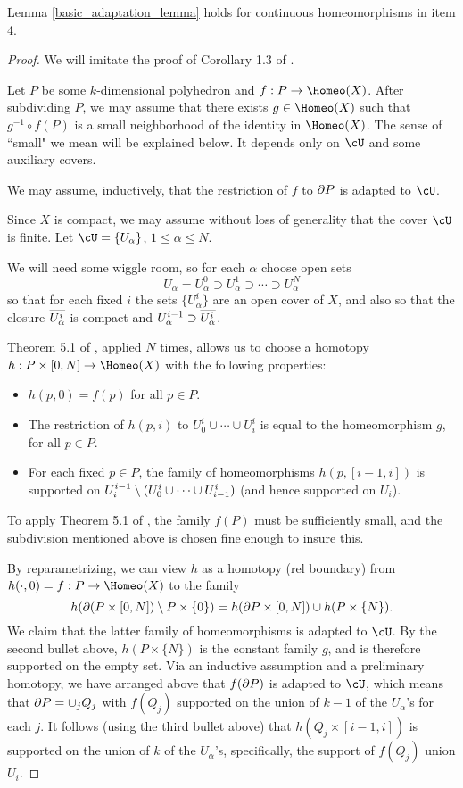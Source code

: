 \begin{lemma} \label{basic_adaptation_lemma_2}
Lemma \ref{basic_adaptation_lemma} holds for continuous homeomorphisms
in item 4.
\end{lemma}

\begin{proof}
We will imitate the proof of Corollary 1.3 of \cite{MR0283802}.

Let $P$ be some $k$-dimensional polyhedron and $f:P\to \Homeo(X)$.
After subdividing $P$, we may assume that there exists $g\in \Homeo(X)$
such that $g^{-1}\circ f(P)$ is a small neighborhood of the 
identity in $\Homeo(X)$.
The sense of ``small" we mean will be explained below.
It depends only on $\cU$ and some auxiliary covers.

We may assume, inductively, that the restriction of $f$ to $\partial P$ is adapted to $\cU$.

Since $X$ is compact, we may assume without loss of generality that the cover $\cU$ is finite.
Let $\cU = \{U_\alpha\}$, $1\le \alpha\le N$.

We will need some wiggle room, so for each $\alpha$ choose open sets
\[
	U_\alpha = U_\alpha^0 \supset U_\alpha^1 \supset \cdots \supset U_\alpha^N
\]
so that for each fixed $i$ the sets $\{U_\alpha^i\}$ are an open cover of $X$, and also so that
the closure $\overline{U_\alpha^i}$ is compact and $U_\alpha^{i-1} \supset \overline{U_\alpha^i}$.

Theorem 5.1 of \cite{MR0283802}, applied $N$ times, allows us
to choose a homotopy $h:P\times [0,N] \to \Homeo(X)$ with the following properties:
\begin{itemize}
\item $h(p, 0) = f(p)$ for all $p\in P$.
\item The restriction of $h(p, i)$ to $U_0^i \cup \cdots \cup U_i^i$ is equal to the homeomorphism $g$,
for all $p\in P$.
\item For each fixed $p\in P$, the family of homeomorphisms $h(p, [i-1, i])$ is supported on 
$U_i^{i-1} \setminus (U_0^i \cup \cdots \cup U_{i-1}^i)$
(and hence supported on $U_i$).
\end{itemize}
To apply Theorem 5.1 of \cite{MR0283802}, the family $f(P)$ must be sufficiently small,
and the subdivision mentioned above is chosen fine enough to insure this.

By reparametrizing, we can view $h$ as a homotopy (rel boundary) from $h(\cdot,0) = f: P\to\Homeo(X)$
to the family
\[
	h(\partial(P\times [0,N]) \setminus P\times \{0\}) = h(\partial P \times [0,N]) \cup h(P \times \{N\}) .
\]
We claim that the latter family of homeomorphisms is adapted to $\cU$.
By the second bullet above, $h(P\times \{N\})$ is the constant family $g$, and is therefore supported on the empty set.
Via an inductive assumption and a preliminary homotopy, we have arranged above that $f(\partial P)$ is
adapted to $\cU$, which means that $\partial P = \cup_j Q_j$ with $f(Q_j)$ supported on the union of $k-1$
of the $U_\alpha$'s for each $j$.
It follows (using the third bullet above) that $h(Q_j \times [i-1,i])$ is supported on the union of $k$ 
of the $U_\alpha$'s, specifically, the support of $f(Q_j)$ union $U_i$.
\end{proof}




